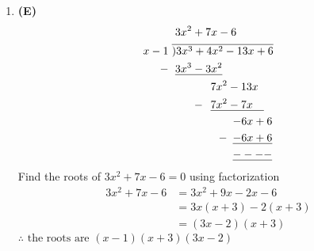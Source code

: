 \begin{multicols}{2}
\begin{enumerate}[label={\textbf{\arabic*.}}]
    \item \textbf{(E)}
      \begin{align*}
        &\hspace{3pt} 3x^2 + 7x - 6 \vspace{-10pt}\\
      x-1 \hspace{3pt}&\overline{)3x^3+4x^2-13x +6} \\
      -\hspace{3pt}& \hspace{3pt} \underline{3x^3 - 3x^2} \\
      \hspace{-40pt} & \hspace{35pt}  7x^2 - 13x \\
      -\hspace{-28pt} & \hspace{35pt} \underline{7x^2 - 7x \hspace{10pt}} \\
      & \hspace{55pt} {-6x + 6} \\
      -\hspace{-50pt}& \hspace{55pt} \underline{-6x + 6} \\
      & \hspace{55pt} \underline{----}
    \end{align*}
    Find the roots of $3x^2 + 7x -6 = 0$ using factorization
    \begin{align*}
      3x^2 + 7x -6 &= 3x^2 + 9x - 2x -6  \\
      & = 3x(x+ 3) -2(x + 3) \\
      & = (3x - 2)(x + 3)
    \end{align*}
    $\therefore \text{ the roots are } (x-1)(x+3)(3x - 2)$


\end{enumerate}
\end{multicols}
